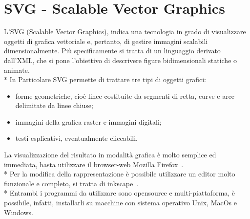 \section{SVG - Scalable Vector Graphics} 
L'SVG (Scalable Vector Graphics), indica una tecnologia in grado di visualizzare oggetti 
di grafica vettoriale e, pertanto, di gestire immagini scalabili dimensionalmente.
Più specificamente si tratta di un linguaggio derivato dall'XML, che si pone l'obiettivo 
di descrivere figure bidimensionali statiche o animate. \\*
In Particolare SVG permette di trattare tre tipi di oggetti grafici:

\begin{itemize}
  \item forme geometriche, cioè linee costituite da segmenti di retta, curve e
  aree delimitate da linee chiuse;
  \item immagini della grafica raster e immagini digitali;
  \item testi esplicativi, eventualmente cliccabili.
\end{itemize} 
 
La visualizzazione del risultato in modalità grafica è molto semplice ed
immediata, basta utilizzare il browser-web Mozilla
Firefox~\cite{firefox_website:1}. \\*
Per la modifica della rappresentazione è possibile utilizzare un editor molto
funzionale e completo, si tratta di inkscape~\cite{Inkscape_website:1}. \\* 
Entrambi i programmi da utilizzare sono opensource e
multi-piattaforma, è possibile, infatti, installarli su macchine con sistema 
operativo Unix, MacOs e Windows.
     


 